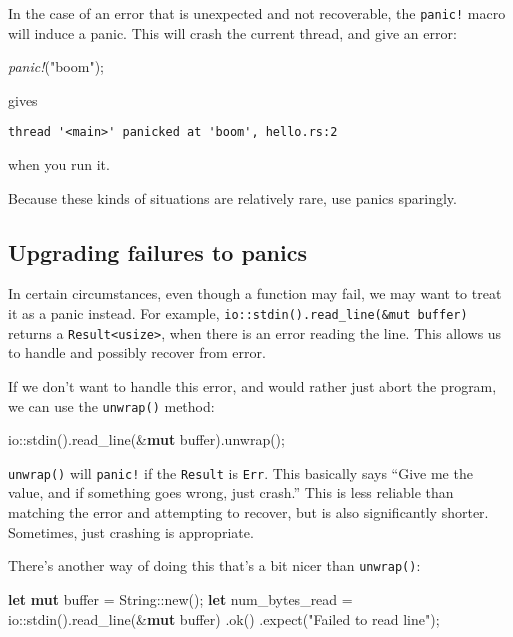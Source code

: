 \documentclass[a4paper,]{book}
\newenvironment{Shaded}{\begin{snugshade}}{\end{snugshade}}
\newcommand{\KeywordTok}[1]{\textcolor[rgb]{0.13,0.29,0.53}{\textbf{{#1}}}}
\newcommand{\DataTypeTok}[1]{\textcolor[rgb]{0.13,0.29,0.53}{{#1}}}
\newcommand{\StringTok}[1]{\textcolor[rgb]{0.31,0.60,0.02}{{#1}}}
\newcommand{\PreprocessorTok}[1]{\textcolor[rgb]{0.56,0.35,0.01}{\textit{{#1}}}}
\newcommand{\NormalTok}[1]{{#1}}
\begin{document}
In the case of an error that is unexpected and not recoverable, the
\texttt{panic!} macro will induce a panic. This will crash the current
thread, and give an error:

\begin{Shaded}
\begin{Highlighting}[]
\PreprocessorTok{panic!}\NormalTok{(}\StringTok{"boom"}\NormalTok{);}
\end{Highlighting}
\end{Shaded}

gives

\begin{verbatim}
thread '<main>' panicked at 'boom', hello.rs:2
\end{verbatim}

when you run it.

Because these kinds of situations are relatively rare, use panics
sparingly.

\subsection{Upgrading failures to
panics}\label{upgrading-failures-to-panics}

In certain circumstances, even though a function may fail, we may want
to treat it as a panic instead. For example,
\texttt{io::stdin().read\_line(\&mut\ buffer)} returns a
\texttt{Result\textless{}usize\textgreater{}}, when there is an error
reading the line. This allows us to handle and possibly recover from
error.

If we don't want to handle this error, and would rather just abort the
program, we can use the \texttt{unwrap()} method:

\begin{Shaded}
\begin{Highlighting}[]
\NormalTok{io::stdin().read_line(&}\KeywordTok{mut} \NormalTok{buffer).unwrap();}
\end{Highlighting}
\end{Shaded}

\texttt{unwrap()} will \texttt{panic!} if the \texttt{Result} is
\texttt{Err}. This basically says ``Give me the value, and if something
goes wrong, just crash.'' This is less reliable than matching the error
and attempting to recover, but is also significantly shorter. Sometimes,
just crashing is appropriate.

There's another way of doing this that's a bit nicer than
\texttt{unwrap()}:

\begin{Shaded}
\begin{Highlighting}[]
\KeywordTok{let} \KeywordTok{mut} \NormalTok{buffer = }\DataTypeTok{String}\NormalTok{::new();}
\KeywordTok{let} \NormalTok{num_bytes_read = io::stdin().read_line(&}\KeywordTok{mut} \NormalTok{buffer)}
                                \NormalTok{.ok()}
                                \NormalTok{.expect(}\StringTok{"Failed to read line"}\NormalTok{);}
\end{Highlighting}
\end{Shaded}
\end{document}
